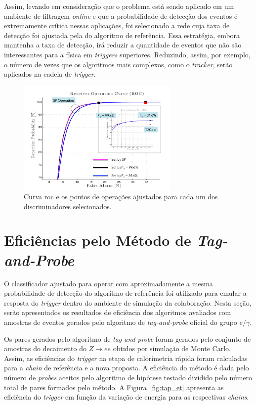 Assim, levando em consideração que o problema está sendo aplicado em um ambiente de filtragem \textit{online} e que a 
probabilidade de detecção dos eventos é extremamente crítica nessas aplicações, foi selecionado a rede cuja taxa de
detecção foi ajustada pela do algoritmo de referência. Essa estratégia, embora mantenha a taxa de detecção, irá reduzir a
quantidade de eventos que não são interessantes para a física em \textit{triggers} superiores. Reduzindo, assim, por exemplo, o 
número de vezes que os algoritmos mais complexos, como o \textit{tracker}, serão aplicados na cadeia de \textit{trigger}.

\begin{figure}[h!t]
\centering
\includegraphics[width=0.7\textwidth]{figures/plots/roc.pdf}
\caption[Curva \gls{roc}]{Curva \gls{roc} e os pontos de operações ajustados para cada um dos discriminadores selecionados.}
\label{fig:roc}
\end{figure}



\section{Eficiências pelo Método de \textit{Tag-and-Probe}}

O classificador ajustado para operar com aproximadamente a mesma probabilidade de detecção do algoritmo de referência foi 
utilizado para emular a resposta do \textit{trigger} dentro do ambiente de simulação da colaboração.  
Nesta seção, serão apresentados os resultados de eficiência dos algoritmos avaliados com amostras de eventos gerados
pelo algoritmo de \textit{tag-and-probe} oficial do grupo $e/\gamma$.

Os pares gerados pelo algoritmo de \textit{tag-and-probe} foram gerados pelo conjunto de amostras do decaimento do $Z\rightarrow ee$
obtidos por simulação de Monte Carlo. Assim, as eficiências do \textit{trigger} na etapa de calorimetria rápida foram calculadas
para a \textit{chain} de referência e a nova proposta. A eficiência do método é dada pelo número
de \textit{probes} aceitos pelo algoritmo de hipótese testado dividido pelo número total de pares formados pelo método. A Figura~\ref{fig:tap_et}
apresenta as eficiência do \textit{trigger} em função da variação de energia para as respectivas \textit{chains}.

